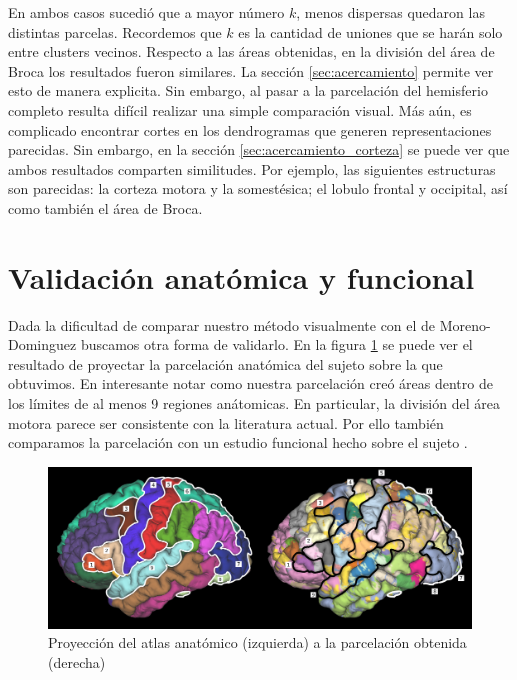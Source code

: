 En ambos casos sucedi\'o que a mayor n\'umero $k$, menos dispersas quedaron las
distintas parcelas. Recordemos que $k$ es la cantidad de uniones que se har\'an
solo entre clusters vecinos. Respecto a las \'areas obtenidas, en la divisi\'on
del \'area de Broca los resultados fueron similares. La secci\'on \ref{sec:acercamiento} 
permite ver esto de manera explicita. Sin embargo, al pasar a la parcelaci\'on 
del hemisferio completo resulta dif\'icil realizar una simple comparaci\'on visual.
M\'as a\'un, es complicado encontrar cortes en los dendrogramas que generen 
representaciones parecidas. Sin embargo, en la secci\'on \ref{sec:acercamiento_corteza}
se puede ver que ambos resultados comparten similitudes. Por ejemplo, las 
siguientes estructuras son parecidas: la corteza motora y la somest\'esica; 
el lobulo frontal y occipital, as\'i como tambi\'en el \'area de Broca.


\section{Validaci\'on anat\'omica y funcional}

Dada la dificultad de comparar nuestro m\'etodo visualmente con el de Moreno-Dominguez
buscamos otra forma de validarlo. En la figura \ref{fig:an2pa} se puede ver
el resultado de proyectar la parcelaci\'on anat\'omica del sujeto sobre la que
obtuvimos. En interesante notar como nuestra parcelaci\'on cre\'o \'areas dentro
de los l\'imites de al menos 9 regiones an\'atomicas. En particular, la divisi\'on
del \'area motora parece ser consistente con la literatura actual. Por ello 
tambi\'en comparamos la parcelaci\'on con un estudio funcional hecho sobre el 
sujeto \cite{Barch2013}. 

\begin{figure}[h!]
    \includegraphics[width=\textwidth]{img/anatomica2parcelation.png}
    \caption{Proyecci\'on del atlas anat\'omico (izquierda) a la parcelaci\'on obtenida (derecha)}
    \label{fig:an2pa}
\end{figure}

